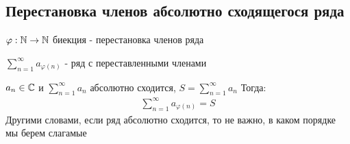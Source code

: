 \subsection{Перестановка членов абсолютно сходящегося ряда}
\newcommand{\sumn}{\sum \limits_{n=1}^\infty}
\newcommand{\sumk}{\sum \limits_{k=1}^n}
\newcommand{\prodn}{\prod \limits_{n=1}^\infty}
\newcommand{\prodk}{\prod \limits_{k=1}^n}

\begin{conj}

    $\varphi: \mathbb{N} \to \mathbb{N}$ биекция - перестановка членов ряда

    $\sum \limits_{n=1}^\infty a_{\varphi(n)}$
     - ряд с переставленными членами
\end{conj}

\begin{theorem}
    $a_n \in \mathbb{C}$ и $\sumn a_n$ абсолютно сходится, $S = \sumn a_n$
    Тогда:
    \begin{gather*}
        \sumn a_{\varphi(n)} = S
    \end{gather*}
    Другими словами, если ряд абсолютно сходится, то не важно, в каком порядке мы берем слагамые
\end{theorem}


